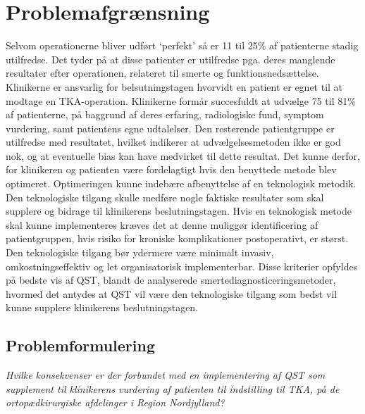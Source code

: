 \section{Problemafgrænsning}
Selvom operationerne bliver udført ‘perfekt’ så er 11 til 25\% af patienterne stadig utilfredse. Det tyder på at disse patienter er utilfredse pga. deres manglende resultater efter operationen, relateret til smerte og funktionsnedsættelse. Klinikerne er ansvarlig for belsutningstagen hvorvidt en patient er egnet til at modtage en TKA-operation. Klinikerne formår succesfuldt at udvælge 75 til 81\% af patienterne, på baggrund af deres erfaring, radiologiske fund, symptom vurdering, samt patientens egne udtalelser. Den resterende patientgruppe er utilfredse med resultatet, hvilket indikerer at udvælgelsesmetoden ikke er god nok, og at eventuelle bias kan have medvirket til dette resultat. Det kunne derfor, for klinikeren og patienten være fordelagtigt hvis den benyttede metode blev optimeret. Optimeringen kunne indebære afbenyttelse af en teknologisk metodik. Den teknologiske tilgang skulle medføre nogle faktiske resultater som skal supplere og bidrage til klinikerens beslutningstagen. Hvis en teknologisk metode skal kunne implementeres kræves det at denne muliggør identificering af patientgruppen, hvis risiko for kroniske komplikationer postoperativt, er størst. Den teknologiske tilgang bør ydermere være minimalt invasiv, omkostningseffektiv og let organisatorisk implementerbar. Disse kriterier opfyldes på bedste vis af QST, blandt de analyserede smertediagnosticeringsmetoder, hvormed det antydes at QST vil være den teknologiske tilgang som bedst vil kunne supplere klinikerens beslutningstagen. 

\subsection*{Problemformulering}

\begin{center}
	\textit{Hvilke konsekvenser er der forbundet med en implementering af QST som supplement til klinikerens vurdering af patienten til indstilling til TKA, på de ortopædkirurgiske afdelinger i Region Nordjylland?}
\end{center}

